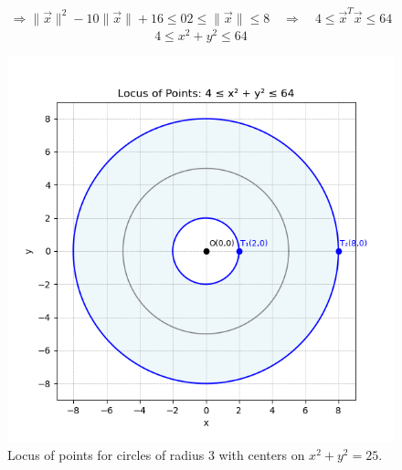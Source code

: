 \documentclass[a4paper,12pt]{article}
\begin{document}
\begin{align}
\Rightarrow \|\vec{x}\|^2 - 10\|\vec{x}\| + 16 \le 0
2 \le \|\vec{x}\| \le 8
\quad \Rightarrow \quad
4 \le \vec{x}^T\vec{x} \le 64
\end{align}
\[
\boxed{4 \le x^2 + y^2 \le 64}
\]
\begin{figure}[h!]
    \centering
    \includegraphics[width=0.7\linewidth]{Figs/Figure_1.png}
    \caption{Locus of points for circles of radius 3 with centers on $x^2 + y^2 = 25$.}
    \label{fig:locus}
\end{figure}
\end{document}
